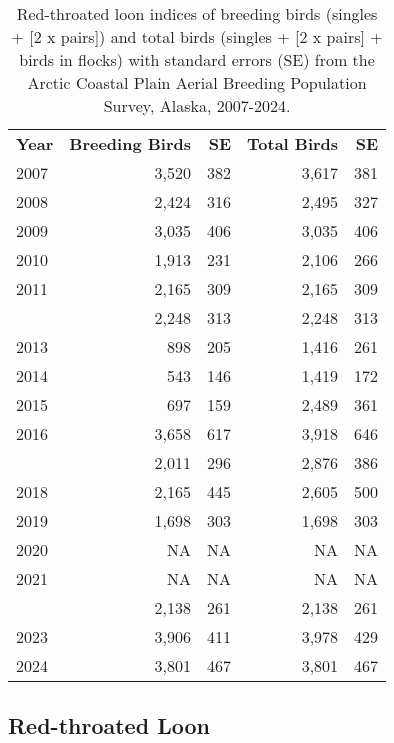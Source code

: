 \documentclass[
]{article}
\begin{document}
\begin{longtable}[t]{lrrrr}

\caption{\label{tbl-RTLO}Red-throated loon indices of breeding birds
(singles + {[}2 x pairs{]}) and total birds (singles + {[}2 x pairs{]} +
birds in flocks) with standard errors (SE) from the Arctic Coastal Plain
Aerial Breeding Population Survey, Alaska, 2007-2024.}

\tabularnewline

\\
\toprule
\textbf{Year} & \textbf{Breeding Birds} & \textbf{SE} & \textbf{Total Birds} & \textbf{SE}\\
\midrule
2007 & 3,520 & 382 & 3,617 & 381\\
2008 & 2,424 & 316 & 2,495 & 327\\
2009 & 3,035 & 406 & 3,035 & 406\\
2010 & 1,913 & 231 & 2,106 & 266\\
2011 & 2,165 & 309 & 2,165 & 309\\
\addlinespace
2012 & 2,248 & 313 & 2,248 & 313\\
2013 & 898 & 205 & 1,416 & 261\\
2014 & 543 & 146 & 1,419 & 172\\
2015 & 697 & 159 & 2,489 & 361\\
2016 & 3,658 & 617 & 3,918 & 646\\
\addlinespace
2017 & 2,011 & 296 & 2,876 & 386\\
2018 & 2,165 & 445 & 2,605 & 500\\
2019 & 1,698 & 303 & 1,698 & 303\\
2020 & NA & NA & NA & NA\\
2021 & NA & NA & NA & NA\\
\addlinespace
2022 & 2,138 & 261 & 2,138 & 261\\
2023 & 3,906 & 411 & 3,978 & 429\\
2024 & 3,801 & 467 & 3,801 & 467\\
\bottomrule

\end{longtable}

\endgroup{}

\newpage{}

\subsection*{Red-throated Loon}\label{red-throated-loon-2}
\end{document}
